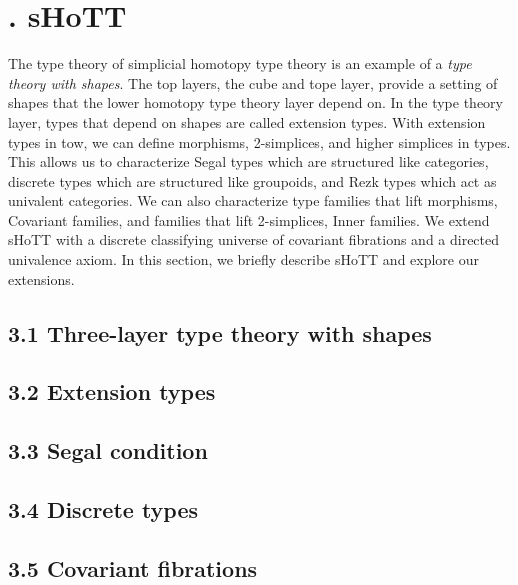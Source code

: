 \documentclass{article}
\theoremstyle{named}
\theoremstyle{remark}
\theoremstyle{definition}
\begin{document}
\section*{. sHoTT}
\setcounter{section}{3}
The type theory of simplicial homotopy type theory is an example of a \textit{type theory with shapes}. The top layers,
the cube and tope layer, provide a setting of shapes that the lower homotopy type theory layer depend on. In the type
theory layer, types that depend on shapes are called extension types. With extension types in tow, we can define morphisms,
2-simplices, and higher simplices in types. This allows us to characterize Segal types which are structured like categories, 
discrete types which are structured like groupoids, and Rezk types which act as univalent categories. We can also characterize 
type families that lift morphisms, Covariant families, and families that lift 2-simplices, Inner families. We extend sHoTT with a
 discrete classifying universe of covariant fibrations and a directed univalence axiom. In this section, we briefly describe sHoTT 
 and explore our extensions.

\subsection*{3.1 Three-layer type theory with shapes}



\subsection*{3.2 Extension types}



\subsection*{3.3 Segal condition}


\subsection*{3.4 Discrete types}


\subsection*{3.5 Covariant fibrations}

\end{document}
